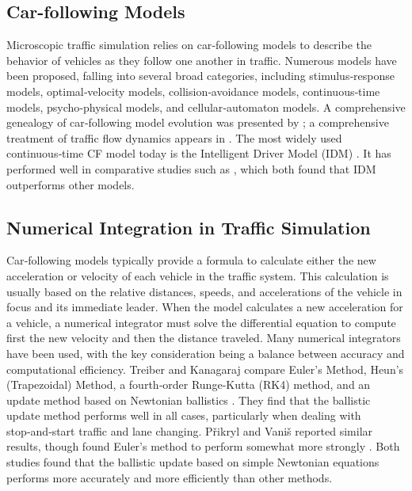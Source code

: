 \documentclass{scspaperproc}
\theoremstyle{scsthe}
\begin{document}
\subsection{Car-following Models}
Microscopic traffic simulation relies on car‑following models to describe the behavior of vehicles as they follow 
one another in traffic. Numerous models have been proposed, falling into several broad categories, including 
stimulus‑response models, optimal‑velocity models, collision‑avoidance models, continuous‑time models, 
psycho‑physical models, and cellular‑automaton models. A comprehensive genealogy of car‑following model evolution 
was presented by \cite{van2015genealogy}; a comprehensive treatment of traffic flow dynamics appears in \cite{kesting2013traffic}. The most widely used continuous‑time CF model today is the Intelligent 
Driver Model (IDM) \cite{treiber2000congested}. It has performed well in comparative studies such as 
\cite{zhang2021comprehensive, pourabdollah2017calibration}, which both found that IDM outperforms other models.

\subsection{Numerical Integration in Traffic Simulation}
Car‑following models typically provide a formula to calculate either the new acceleration or velocity of each 
vehicle in the traffic system. This calculation is usually based on the relative distances, speeds, and 
accelerations of the vehicle in focus and its immediate leader. When the model calculates a new acceleration for a 
vehicle, a numerical integrator must solve the differential equation to compute first the new velocity and then the 
distance traveled. Many numerical integrators have been used, with the key consideration being a balance between 
accuracy and computational efficiency. Treiber and Kanagaraj compare Euler’s Method, Heun’s (Trapezoidal) Method, a 
fourth‑order Runge‑Kutta (RK4) method, and an update method based on Newtonian ballistics 
\cite{treiber2015comparing}. They find that the ballistic update method performs well in all cases, particularly 
when dealing with stop‑and‑start traffic and lane changing. P\v{r}ikryl and Vani\v{s} reported similar results, 
though found Euler’s method to perform somewhat more strongly \cite{pvrikryl2017comparing}. Both studies found that 
the ballistic update based on simple Newtonian equations performs more accurately and more efficiently than other 
methods.
\end{document}

